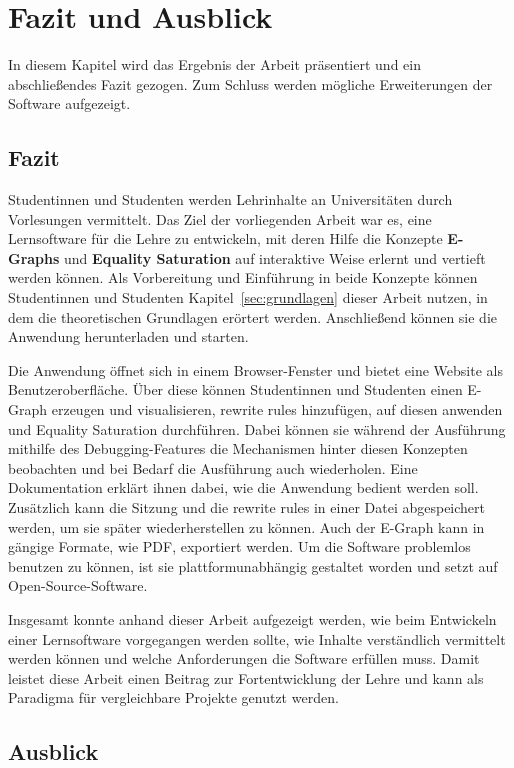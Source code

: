 \section{Fazit und Ausblick}\label{sec:fazit}

In diesem Kapitel wird das Ergebnis der Arbeit präsentiert und ein abschließendes Fazit gezogen. Zum Schluss werden mögliche Erweiterungen der Software aufgezeigt. 

\subsection{Fazit}

Studentinnen und Studenten werden Lehrinhalte an Universitäten durch Vorlesungen vermittelt. Das Ziel der vorliegenden Arbeit war es, eine Lernsoftware für die Lehre
zu entwickeln, mit deren Hilfe die Konzepte \textbf{E-Graphs} und \textbf{Equality Saturation} auf interaktive Weise erlernt und vertieft werden können.
Als Vorbereitung und Einführung in beide Konzepte können Studentinnen und Studenten Kapitel~\ref{sec:grundlagen} dieser Arbeit nutzen, in dem die theoretischen Grundlagen erörtert werden.
Anschließend können sie die Anwendung herunterladen und starten. 

Die Anwendung öffnet sich in einem Browser-Fenster und bietet eine Website als Benutzeroberfläche. Über diese können Studentinnen und Studenten einen E-Graph erzeugen und visualisieren, 
rewrite rules hinzufügen, auf diesen anwenden und Equality Saturation durchführen. 
Dabei können sie während der Ausführung mithilfe des Debugging-Features die Mechanismen hinter diesen Konzepten beobachten und bei Bedarf die Ausführung auch wiederholen.
Eine Dokumentation erklärt ihnen dabei, wie die Anwendung bedient werden soll. Zusätzlich kann die Sitzung und die rewrite rules in einer Datei abgespeichert werden, um
sie später wiederherstellen zu können. Auch der E-Graph kann in gängige Formate, wie PDF, exportiert werden.
Um die Software problemlos benutzen zu können, ist sie plattformunabhängig gestaltet worden und setzt auf Open-Source-Software.

Insgesamt konnte anhand dieser Arbeit aufgezeigt werden, wie beim Entwickeln einer Lernsoftware vorgegangen werden sollte, wie Inhalte verständlich vermittelt werden können und welche
Anforderungen die Software erfüllen muss.
Damit leistet diese Arbeit einen Beitrag zur Fortentwicklung der Lehre und kann als Paradigma für vergleichbare Projekte genutzt werden.

\subsection{Ausblick}

